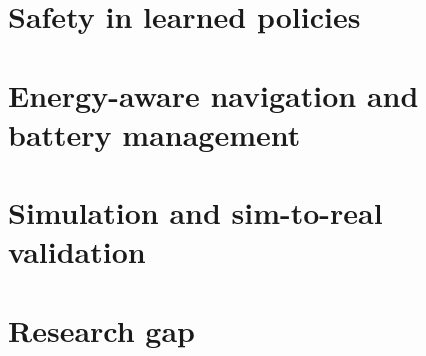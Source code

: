 \section{Safety in learned policies}
\label{sec:safe-learning}

\section{Energy-aware navigation and battery management}
\label{sec:energy-aware}

\section{Simulation and sim-to-real validation}
\label{sec:sim2real}

\section{Research gap}
\label{sec:gap}
